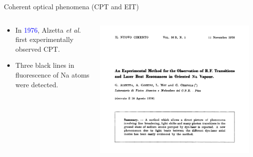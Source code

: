 \documentclass[9pt,aspectratio94]{beamer}
\begin{document}

 \begin{frame}{Coherent optical phenomena (CPT and EIT)}
 \begin{columns}
    \begin{column}{0.5\textwidth}
        \begin{itemize}
            \item In \textcolor{blue}{1976}, Alzetta \textit{et al.} first experimentally observed CPT.
         \item Three black lines in fluorescence of Na atoms were detected.
        \end{itemize}
    \end{column}
    \begin{column}{0.5\textwidth}
       \includegraphics[scale = 0.3]{alzeta}
    \end{column}
\end{columns}
\end{frame}  
\end{document}
